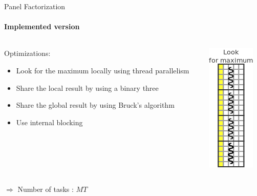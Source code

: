 \begin{frame}{Panel Factorization}
\framesubtitle{Implemented version}
\begin{columns}
\begin{column}{.70\textwidth}
Optimizations:
\begin{itemize}
\item Look for the maximum locally using thread parallelism
\item Share the local result by using a binary three
\item Share the global result by using Bruck's algorithm
\item Use internal blocking
\end{itemize}
\end{column}
\hfill
\begin{column}{.30\textwidth}
\begin{center}
\includegraphics[scale=0.8]{panel_max_opt1.png}
\end{center}
\end{column}
\end{columns}
\pause
\begin{exampleblock}{}
$\Longrightarrow$ Number of tasks : $MT$
\end{exampleblock}{}
\end{frame}

